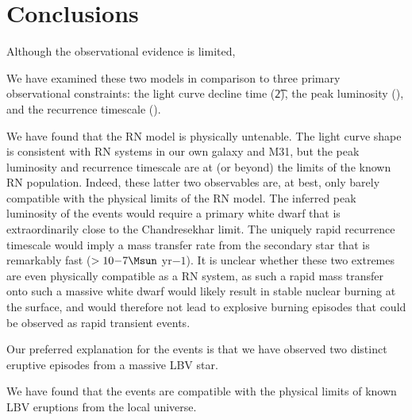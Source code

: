 \section{Conclusions}
\label{sec:Conclusions}

Although the observational evidence is limited,


We have examined these two models in comparison to three primary
observational constraints: the light curve decline time (\t2), the
peak luminosity (\Lpk), and the recurrence timescale (\trec).

We have found that the RN model is physically untenable. The light
curve shape is consistent with RN systems in our own galaxy and M31,
but the peak luminosity and recurrence timescale are at (or beyond)
the limits of the known RN population.  Indeed, these latter two
observables are, at best, only barely compatible with the physical
limits of the RN model. The inferred peak luminosity of the \spock
events would require a primary white dwarf that is extraordinarily
close to the Chandresekhar limit.  The uniquely rapid recurrence
timescale would imply a mass transfer rate from the secondary star
that is remarkably fast ($>10{-7} \Msun$ yr${-1}$).  It is unclear
whether these two extremes are even physically compatible as a RN
system, as such a rapid mass transfer onto such a massive white dwarf
would likely result in stable nuclear burning at the surface, and
would therefore not lead to explosive burning episodes that could be
observed as rapid transient events.

Our preferred explanation for the \spock events is that we have
observed two distinct eruptive episodes from a massive LBV star. 

We have found that the \spock events are compatible with the physical
limits of known LBV eruptions from the local universe.  




